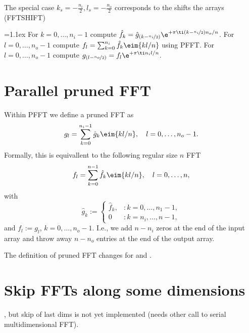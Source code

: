The special case $k_s=-\frac{n_i}{2}, l_s=-\frac{n_o}{2}$ corresponds to the shifts the arrays (\textsf{FFTSHIFT})
\begin{algorithm}
  \begin{algorithmic}[1]
    \itemsep=1.1ex
    \State For $k=0,\hdots,n_i-1$ compute $\hat f_k = \hat g_{(k-\nicefrac{n_i}{2})} \e^{+\pi\ti (k-\nicefrac{n_i}{2})n_o/n}$.
    \State For $l=0,\hdots,n_o-1$ compute $f_l = \sum_{k=0}^{n_i} \hat f_k \eim{kl/n}$ using PFFT.
    \State For $l=0,\hdots,n_o-1$ compute $g_{(l-\nicefrac{n_o}{2})} = f_l \e^{+\pi\ti n_i l/n}$.
  \end{algorithmic}
\end{algorithm}




\section{Parallel pruned FFT}
Within PFFT we define a pruned FFT as
\begin{equation*}
  g_l = \sum_{k=0}^{n_i-1} \hat g_{k} \eim{kl/n}, \quad l=0,\hdots,n_o-1.
\end{equation*}
Formally, this is equivallent to the following regular size $n$ FFT
\begin{equation*}
  f_l = \sum_{k=0}^{n-1} \hat f_{k} \eim{kl/n}, \quad l=0,\hdots,n,
\end{equation*}
with 
\begin{equation*}
  \hat g_k := 
  \begin{cases}
  \hat f_k, &: k=0,\hdots,n_1-1, \\
  0         &: k=n_i,\hdots,n-1,    
  \end{cases}
\end{equation*}
and $f_l := g_l$, $k=0,\hdots,n_o-1$. I.e., we add $n-n_i$ zeros at the end of the input array and throw away $n-n_o$ entries at the end of the output array.


The definition of pruned FFT changes for  and .


\section{Skip FFTs along some dimensions}

, but skip of last  dims is not yet implemented (needs other call to serial multidimensional FFT). 





